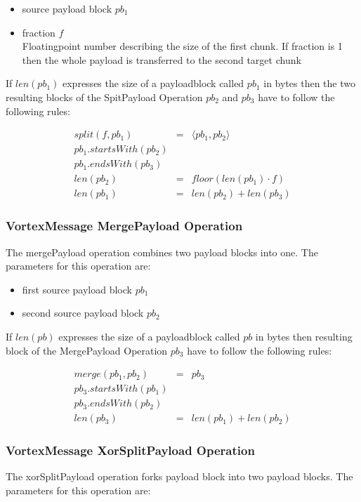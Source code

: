 \begin{itemize}
	\item source payload block $pb_1$
	\item fraction $f$\\
	      Floatingpoint number describing the size of the first chunk. If fraction is 1 then the whole payload is transferred to the second target chunk
\end{itemize}

If $len(pb_1)$ expresses the size of a payloadblock called $pb_1$ in bytes then the two resulting blocks of the SpitPayload Operation $pb_2$ and $pb_3$ have to follow the following rules:

\begin{eqnarray}
split(f, pb_1) & = &\langle pb_1, pb_2 \rangle\\
pb_1.startsWith(pb_2)\\
pb_1.endsWith(pb_3)\\
len(pb_2) & = & floor(len(pb_1)\cdot f)\\
len(pb_1) & = & len(pb_2) + len(pb_3)
\end{eqnarray}

\subsubsection{VortexMessage MergePayload Operation}
The mergePayload operation combines two payload blocks into one. The parameters for this operation are:

\begin{itemize}
	\item first source payload block $pb_1$
	\item second source payload block $pb_2$
\end{itemize}

If $len(pb)$ expresses the size of a payloadblock called $pb$ in bytes then resulting block of the MergePayload Operation $pb_3$ have to follow the following rules:

\begin{eqnarray}
merge(pb_1, pb_2) & = & pb_3 \\
pb_3.startsWith(pb_1)\\
pb_3.endsWith(pb_2)\\
len(pb_3) & = & len(pb_1) + len(pb_2)
\end{eqnarray}

\subsubsection{VortexMessage XorSplitPayload Operation}
The xorSplitPayload operation forks payload block into two payload blocks. The parameters for this operation are:

